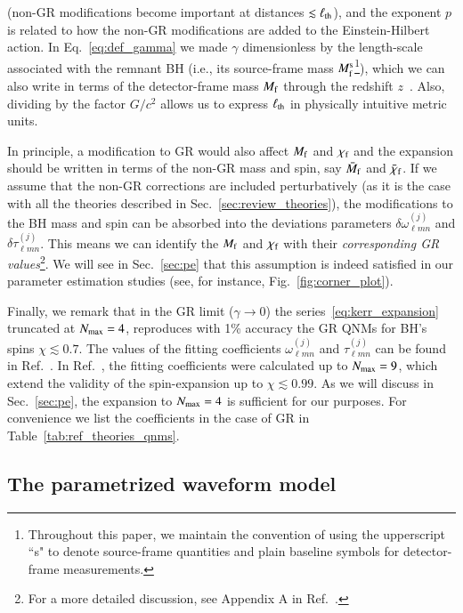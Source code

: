 \documentclass[twocolumn,
               prd,
               aps,
               superscriptaddress,
               tightenlines,
               nofootinbib,
               eqsecnum,
               amsfonts,
               amsmath,
               longbibliography]{revtex4-1}
\begin{document}
(non-GR modifications become important at distances $\lesssim \ell_{\rm th}$), and
the exponent $p$ is related to how the non-GR modifications are
added to the Einstein-Hilbert action.
%
In Eq.~\eqref{eq:def_gamma} we made $\gamma$ dimensionless by the
length-scale associated with the remnant BH (i.e., its source-frame mass
$M^{\rm s}_{\rm f}$\footnote{Throughout this paper, we maintain the convention of
using the upperscript ``s" to denote source-frame quantities and plain baseline
symbols for detector-frame measurements.}), which we can also write in terms of the detector-frame mass $M_{\rm f}$
through the redshift $z$~\cite{Krolak:1987ofj}. Also, dividing by the factor $G/c^2$ allows us to
express $\ell_{\rm th}$ in physically intuitive metric units.

In principle, a modification to GR would also affect $M_{\rm f}$ and $\chi_{\rm f}$ and the
expansion should be written in terms of the non-GR mass and spin, say $\bar{M}_{\rm f}$ and
$\bar{\chi}_{\rm f}$. If we assume that the non-GR corrections are included perturbatively
(as it is the case with all the theories described in Sec.~\ref{sec:review_theories}),
the modifications to the BH mass and spin can be absorbed into the deviations
parameters $\delta\omega^{(j)}_{\ell m n}$ and $\delta\tau^{(j)}_{\ell m n}$.
%
This means we can identify the $M_{\rm f}$ and $\chi_{\rm f}$ with their
\emph{corresponding {\rm GR} values}\footnote{For a more detailed discussion, see Appendix A in Ref.~\cite{Maselli:2019mjd}.}.
%
We will see in Sec.~\ref{sec:pe}  that this assumption is indeed
satisfied in our parameter estimation studies (see, for instance, Fig.~\ref{fig:corner_plot}).

Finally, we remark that in the GR limit ($\gamma \to 0$)
the series~\eqref{eq:kerr_expansion} truncated at $N_{\rm max} = 4$, reproduces with 1\% accuracy
the GR QNMs for BH's spins $\chi \lesssim 0.7$.
%
The values of the fitting coefficients $\omega_{\ell m n}^{(j)}$ and $\tau_{\ell m n}^{(j)}$
can be found in Ref.~\cite{Maselli:2019mjd}.
%
In Ref.~\cite{Carullo:2021dui}, the fitting coefficients were calculated up to $N_{\rm max} = 9$,
which extend the validity of the spin-expansion up to $\chi \lesssim 0.99$.
%
As we will discuss in Sec.~\ref{sec:pe}, the expansion to $N_{\rm max} = 4$ is
sufficient for our purposes. For convenience we list the coefficients in the case of
GR in Table~\ref{tab:ref_theories_qnms}.

\subsection{The parametrized waveform model}
\label{sec:review_pSEOB}
\end{document}
